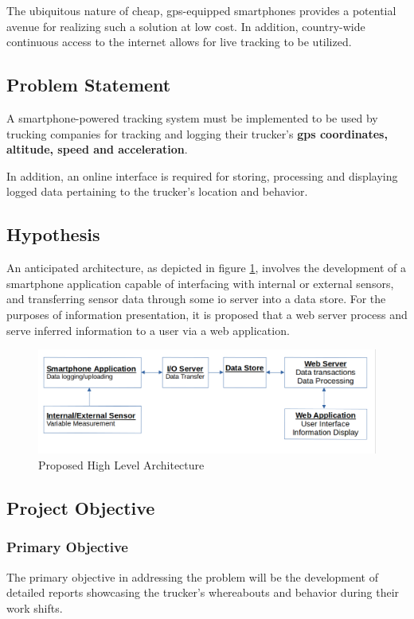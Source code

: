 The ubiquitous nature of cheap, \ac{gps}-equipped smartphones provides a potential avenue for realizing such a solution at low cost.
In addition, country-wide continuous access to the internet allows for live tracking to be utilized. 

\subsection{Problem Statement}
A smartphone-powered tracking system must be implemented to be used by trucking companies for tracking and logging their trucker's \textbf{\ac{gps} coordinates, altitude, speed and acceleration}.

In addition, an online interface is required for storing, processing and displaying logged data pertaining to the trucker's location and behavior.

\subsection{Hypothesis}
An anticipated architecture, as depicted in figure \ref{fig:high_arch}, involves the development of a smartphone application capable of interfacing with internal or external sensors, and transferring sensor data through some \ac{io} server into a data store. \cite{bertocco1998client}
For the purposes of information presentation, it is proposed that a web server process and serve inferred information to a user via a web application.
\begin{figure}[H]
    \centering
    \includegraphics[scale=0.45]{high_arch.png}
    \caption{Proposed High Level Architecture}
    \label{fig:high_arch}
\end{figure}

\subsection{Project Objective}
\subsubsection{Primary Objective}
The primary objective in addressing the problem will be the development of detailed reports showcasing the trucker's whereabouts and behavior during their work shifts.

